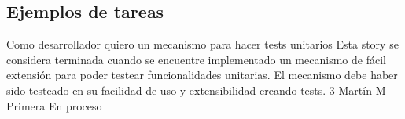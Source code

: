 \newcommand{\task}[7]{
  \hspace{7pt}
	\fbox{
	\begin{minipage}{0.88\textwidth}
    {\small \sffamily


            {\normalsize \textbf{#1:} \textit{#2}}

            \vspace{3pt}

            \textbf{Descripción:} #3

            \vspace{5pt}

            \begin{tabular}{ l c l }
            \textbf{Horas estimadas:} #4 & \hspace{0.2\textwidth} & \textbf{Responsable:} #5 \\[1pt]
            \textbf{Horas faltantes:} #6 & \hspace{0.2\textwidth} & \textbf{Estado:} #7 \\
            \end{tabular}

    }
	\end{minipage}
	}
}





\newpage

\subsection{Ejemplos de tareas}

			{Como desarrollador quiero un mecanismo para hacer tests unitarios} %
			{Esta story se considera terminada cuando se encuentre implementado un mecanismo de fácil extensión para poder testear funcionalidades unitarias. } %
			{El mecanismo debe haber sido testeado en su facilidad de uso y extensibilidad creando tests.} %
			{3} %
			{Martín M} %
			{Primera} %
			{En proceso} %

